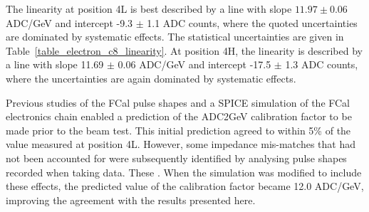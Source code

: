 %




The linearity at position 4L is best described by a line with slope $11.97 \pm 0.06$  ADC/GeV and intercept -9.3 $\pm$ 1.1 ADC counts, where the quoted uncertainties are dominated by  systematic effects. The statistical uncertainties are given in Table~\ref{table_electron_c8_linearity}. At position 4H, the linearity is described by a line with slope 11.69 $\pm$ 0.06 ADC/GeV and intercept -17.5 $\pm$ 1.3 ADC counts, where the uncertainties are again dominated by systematic effects.

Previous studies of the FCal pulse shapes \cite{Rutherfoord:968060,Rutherfoord:970622} and a SPICE simulation of the FCal electronics chain enabled a prediction of the ADC2GeV calibration factor to be made prior to the beam test. This initial prediction agreed to within 5\% of the value measured at position 4L. However, some impedance mis-matches that had not been accounted for were subsequently identified by analysing pulse shapes recorded when taking  data\cite{Fcalpaper}. These . When the simulation was modified to include these effects, the predicted value of the calibration factor became 12.0 ADC/GeV, improving the agreement with the results presented here.


% 
% 
% 
% 
% 
% 
% 



